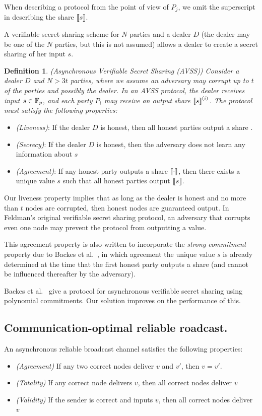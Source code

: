 \documentclass{sig-alternate-05-2015}
\newtheorem{definition}{Definition}
\begin{document}
When describing a protocol from the point of view of $P_j$, we omit the superscript in describing the share ${ \llbracket {s} \rrbracket }$.

A verifiable secret sharing scheme for $N$ parties and a dealer $D$ (the dealer may be one of the $N$ parties, but this is not assumed) allows a dealer to create a secret sharing of her input $s$.

\begin{definition}(Asynchronous Verifiable Secret Sharing (AVSS))
  Consider a dealer $D$ and $N > 3t$ parties, where we assume an adversary may corrupt up to $t$ of the parties and possibly the dealer. 
  In an AVSS protocol, the dealer receives input $s \in {\ensuremath{\mathbb{F}_p}}$, and each party $P_i$ may receive an output share ${ \llbracket {s} \rrbracket }^{(i)}$. The protocol must satisfy the following properties:
\end{definition}
\begin{itemize}
\item \emph{(Liveness)}: If the dealer $D$ is honest, then all honest parties output a share .
\item \emph{(Secrecy)}: If the dealer $D$ is honest, then the adversary does not learn any information about $s$
\item \emph{(Agreement)}: If any honest party outputs a share ${ \llbracket {\cdot} \rrbracket }$, then there exists a unique value $s$ such that all honest parties output ${ \llbracket {s} \rrbracket }$.
\end{itemize}

Our liveness property implies that as long as the dealer is honest and no more than $t$ nodes are corrupted, then honest nodes are guaranteed output. In Feldman's original verifiable secret sharing protocol, an adversary that corrupts even one node may prevent the protocol from outputting a value.

This agreement property is also written to incorporate the \emph{strong commitment} property due to Backes et al.~\cite{eavss}, in which  agreement the unique value $s$ is already determined  at the time that the first honest party outputs a share (and cannot be influenced thereafter by the adversary).

Backes et al.~\cite{} give a protocol for asynchronous verifiable secret sharing using polynomial commitments. Our solution improves on the performance of this.

\subsection{Communication-optimal reliable roadcast.}
An asynchronous reliable broadcast channel satisfies the following properties:
\begin{itemize}
  \item \emph{(Agreement)} If any two correct nodes deliver $v$ and $v'$, then $v = v'$.
  \item \emph{(Totality)} If any correct node delivers $v$, then all correct nodes deliver $v$
  \item \emph{(Validity)} If the sender is correct and inputs $v$, then all correct nodes deliver $v$
\end{itemize}
\end{document}
